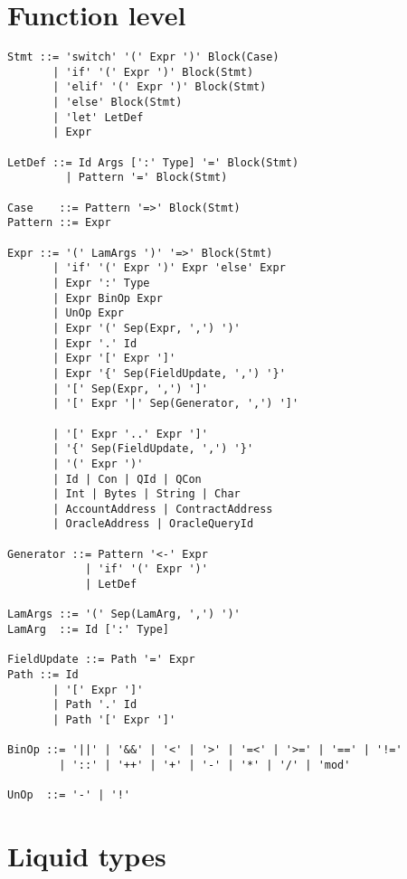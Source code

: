 \section{Function level}

\begin{lstlisting}[language=bnf]
Stmt ::= 'switch' '(' Expr ')' Block(Case)
       | 'if' '(' Expr ')' Block(Stmt)
       | 'elif' '(' Expr ')' Block(Stmt)
       | 'else' Block(Stmt)
       | 'let' LetDef
       | Expr

LetDef ::= Id Args [':' Type] '=' Block(Stmt)
         | Pattern '=' Block(Stmt)

Case    ::= Pattern '=>' Block(Stmt)
Pattern ::= Expr

Expr ::= '(' LamArgs ')' '=>' Block(Stmt)
       | 'if' '(' Expr ')' Expr 'else' Expr
       | Expr ':' Type
       | Expr BinOp Expr
       | UnOp Expr
       | Expr '(' Sep(Expr, ',') ')'
       | Expr '.' Id
       | Expr '[' Expr ']'
       | Expr '{' Sep(FieldUpdate, ',') '}'
       | '[' Sep(Expr, ',') ']'
       | '[' Expr '|' Sep(Generator, ',') ']'

       | '[' Expr '..' Expr ']'
       | '{' Sep(FieldUpdate, ',') '}'
       | '(' Expr ')'
       | Id | Con | QId | QCon
       | Int | Bytes | String | Char
       | AccountAddress | ContractAddress
       | OracleAddress | OracleQueryId

Generator ::= Pattern '<-' Expr
            | 'if' '(' Expr ')'
            | LetDef

LamArgs ::= '(' Sep(LamArg, ',') ')'
LamArg  ::= Id [':' Type]

FieldUpdate ::= Path '=' Expr
Path ::= Id
       | '[' Expr ']'
       | Path '.' Id
       | Path '[' Expr ']'

BinOp ::= '||' | '&&' | '<' | '>' | '=<' | '>=' | '==' | '!='
        | '::' | '++' | '+' | '-' | '*' | '/' | 'mod'

UnOp  ::= '-' | '!'
\end{lstlisting}

\section{Liquid types}
\label{liquid_types_syntax}


